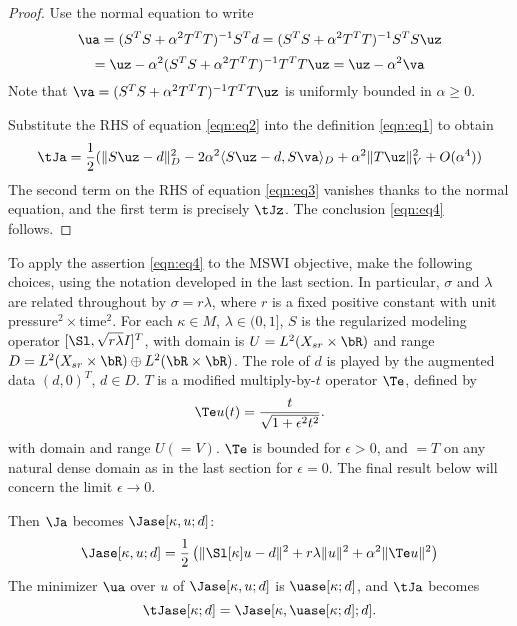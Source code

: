 \begin{proof}
Use the normal equation to write
\[
  \ua = (S^TS + \alpha^2 T^TT)^{-1}S^Td = (S^TS + \alpha^2 T^TT)^{-1}S^TS \uz
\]
\begin{equation}
  \label{eqn:eq2}
  = \uz - \alpha^2 (S^TS + \alpha^2 T^TT)^{-1}T^TT\uz = \uz-\alpha^2 \va
\end{equation}
Note that $\va = (S^TS + \alpha^2 T^TT)^{-1}T^TT\uz$ is uniformly bounded in $\alpha \ge 0$.

Substitute the RHS of equation \ref{eqn:eq2} into the definition \ref{eqn:eq1} to obtain
\begin{equation}
  \label{eqn:eq3}
  \tJa = \frac{1}{2}(\|S\uz-d\|_D^2 - 2 \alpha^2\langle S\uz-d, S\va\rangle_D + \alpha^2\|T\uz\|_V^2 + O(\alpha^4))
\end{equation}
The second term on the RHS of equation \ref{eqn:eq3} vanishes thanks to the normal equation, and the first term is precisely $\tJz$. The conclusion \ref{eqn:eq4} follows.
\end{proof}

To apply the assertion \ref{eqn:eq4} to the MSWI objective, make the
following choices, using the notation developed in the last section.
In particular, $\sigma$ and $\lambda$ are related throughout by
$\sigma=r\lambda$, where $r$ is a fixed positive constant with unit
pressure$^2 \times$time$^2$.
For each $\kappa \in M$, $\lambda \in (0,1]$, $S$ is the regularized
modeling operator $[\Sl,\sqrt{r\lambda} I]^T$, with domain is
$U=L^2(X_{sr}\times\bR)$ and range $D =  L^2(X_{sr} \times \bR) \oplus
L^2(\bR \times \bR)$. The role of $d$ is played by the
augmented data $(d,0)^T$, $d \in D$. $T$ is a modified multiply-by-$t$ operator
$\Te$, defined by 
\begin{equation}
  \label{eqn:teps}
  \Te u(t) = \frac{t}{\sqrt{1+\epsilon^2t^2}}.
\end{equation}
with domain and range $U ( = V)$. $\Te$ is bounded for $\epsilon>0$,
and $=T$ on any natural dense domain as in the last section for $\epsilon=0$. The final result below will
concern the limit $\epsilon \rightarrow 0$.

Then $\Ja$ becomes $\Jase[\kappa,u;d]$:
\begin{equation}
  \label{eqn:mswipen}
   \Jase[\kappa,u;d] = \frac{1}{2}\left(\|\Sl[\kappa]u-d\|^2 +
   r\lambda\|u\|^2 + \alpha^2\|\Te u\|^2\right)
 \end{equation}
The minimizer $\ua$ over $u$ of $\Jase[\kappa,u;d]$ is
$\uase[\kappa;d]$, and $\tJa$ becomes
\begin{equation}
  \label{eqn:mswipenred}
  \tJase[\kappa;d] =
  \Jase[\kappa,\uase[\kappa;d];d].
\end{equation}

